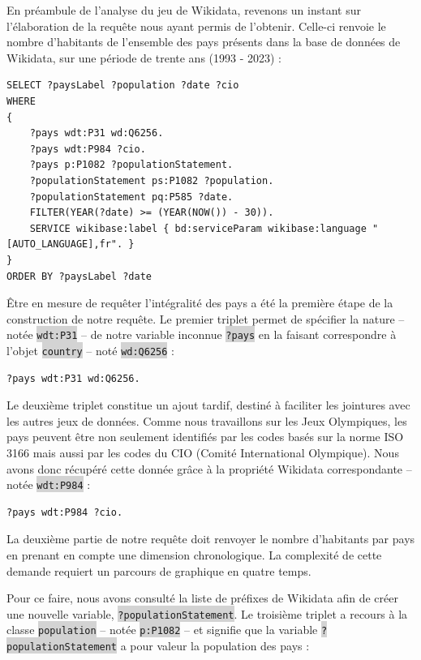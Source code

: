 \documentclass[hidelinks, 12pt]{article}
\newcommand{\code}[1]{\colorbox{LightGray}{\texttt{#1}}}
\begin{document}
En préambule de l'analyse du jeu de Wikidata, revenons un instant sur l'élaboration de la requête nous ayant permis de l'obtenir. Celle-ci renvoie le nombre d'habitants de l'ensemble des pays présents dans la base de données de Wikidata, sur une période de trente ans (1993 - 2023) :

\label{query1}\begin{lstlisting}[language=SPARQL]
SELECT ?paysLabel ?population ?date ?cio
WHERE 
{
	?pays wdt:P31 wd:Q6256.
	?pays wdt:P984 ?cio.
	?pays p:P1082 ?populationStatement.
	?populationStatement ps:P1082 ?population. 
	?populationStatement pq:P585 ?date.
	FILTER(YEAR(?date) >= (YEAR(NOW()) - 30)).
	SERVICE wikibase:label { bd:serviceParam wikibase:language "[AUTO_LANGUAGE],fr". }
}
ORDER BY ?paysLabel ?date
\end{lstlisting}

Être en mesure de requêter l'intégralité des pays a été la première étape de la construction de notre requête. Le premier triplet permet de spécifier la nature -- notée \code{wdt:P31} -- de notre variable inconnue \code{?pays} en la faisant correspondre à l'objet \code{country} -- noté \code{wd:Q6256} :

\begin{lstlisting}[language=SPARQL]
	?pays wdt:P31 wd:Q6256.
\end{lstlisting}

Le deuxième triplet constitue un ajout tardif, destiné à faciliter les jointures avec les autres jeux de données. Comme nous travaillons sur les Jeux Olympiques, les pays peuvent être non seulement identifiés par les codes basés sur la norme ISO 3166 mais aussi par les codes du CIO (Comité International Olympique). Nous avons donc récupéré cette donnée grâce à la propriété Wikidata correspondante -- notée \code{wdt:P984} :

\begin{lstlisting}[language=SPARQL]
	?pays wdt:P984 ?cio.
\end{lstlisting}

La deuxième partie de notre requête doit renvoyer le nombre d'habitants par pays en prenant en compte une dimension chronologique. La complexité de cette demande requiert un parcours de graphique en quatre temps.

Pour ce faire, nous avons consulté la liste de préfixes\autocite{wikiprefixes} de Wikidata afin de créer une nouvelle variable, \code{?populationStatement}. Le troisième triplet a recours à la classe \code{population} -- notée \code{p:P1082} -- et signifie que la variable \code{?populationStatement} a pour valeur la population des pays :
\end{document}

